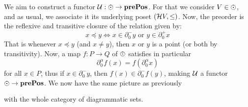 We aim to construct a functor \( \U : \eye \to \prePos \). For that we consider \( V \in \eye \), and as usual, we associate it its underlying poset \( (\mathcal{H} V, \le) \). Now, the preorder is the reflexive and transitive closure of the relation given by:
\begin{equation*}
    x \preceq y \iff x \in \partial^-_0 y \text{ or } y \in \partial^+_0 x
\end{equation*}
That is whenever \( x \preceq y \) (and \( x \neq y \)), then \( x \) or \( y \) is a point (or both by transitivity). Now, a map \( f : P \to Q \) of \( \eye \) satisfies in particular 
\begin{equation*}
    \partial^\alpha_0f(x) = f(\partial^\alpha_0 x) 
\end{equation*}
for all \( x \in P \), thus if \(  x \in \partial^-_0 y \), then \(  f(x) \in \partial^-_0 f(y) \), making \( \mathcal{U} \) a functor \( \eye \to \prePos \). We now have the same picture as previously
\begin{center}
\end{center}
with the whole category of diagrammatic sets.